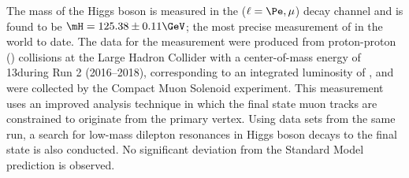 % 
The mass of the Higgs boson is measured in the \hzzfourl
($\ell = \Pe, \mu$) %
decay channel and is found to be $\mH = 125.38 \pm 0.11\GeV$;
the most precise measurement of \mH in the world to date. 
The data for the measurement were produced from proton-proton (\pp) collisions at the Large Hadron Collider with a center-of-mass energy of 13\TeV during Run 2 (2016--2018), corresponding to an integrated luminosity of \lumiruntwo, and were collected by the Compact Muon Solenoid experiment.
This measurement uses an improved analysis technique in which the final state muon tracks are constrained to originate from the primary \pp vertex.
Using data sets from the same run, a search for low-mass dilepton resonances in Higgs boson decays to the \fourl final state is also conducted.
No significant deviation from the Standard Model prediction is observed.

